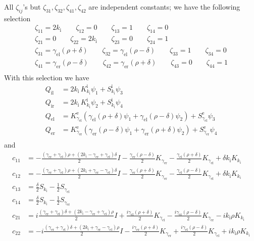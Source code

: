 All $\zeta_{ij}$'s but $\zeta_{31},\zeta_{32},\zeta_{41},\zeta_{42}$ are independent constants; we have the following selection 
\begin{gather*}
  \zeta_{11} = 2 k_\text{i} \qquad \zeta_{12} =0 \qquad \zeta_{13} = 1 \qquad \zeta_{14} = 0\\
  \zeta_{21} = 0 \qquad \zeta_{22} = 2 k_\text{i} \qquad \zeta_{23} = 0 \qquad
\zeta_{24} = 1\\
  \zeta_{31} = \gamma_\text{el}(\rho + \delta) \qquad \zeta_{32} = \gamma_\text{el}(\rho - \delta) \qquad \zeta_{33} = 1 \qquad \zeta_{34} = 0\\
  \zeta_{41} = \gamma_\text{er}(\rho - \delta) \qquad \zeta_{42} = \gamma_\text{er}(\rho + \delta) \qquad \zeta_{43} = 0 \qquad \zeta_{44} = 1\\
\end{gather*}
With this selection we have
\begin{align*}
  Q_\text{il} &= 2 k_\text{i}\,K^\text{i}_{k_\text{i}}\psi_1 + S^\text{i}_{k_\text{i}}\psi_3 \\
  Q_\text{ir} &= 2 k_\text{i}\,K^\text{i}_{k_\text{i}}\psi_2 + S^\text{i}_{k_\text{i}}\psi_4 \\
  Q_\text{el} &= K^{\text{e}}_{\gamma_\text{el}} (\gamma_\text{el} (\rho+\delta)\psi_1 +\gamma_\text{el} (\rho-\delta)\psi_2) + S^{\text{e}}_{\gamma_\text{el}}\psi_3 
 \\
  Q_\text{er} &= K^{\text{e}}_{\gamma_\text{er}} (\gamma_\text{er}(\rho-\delta)\psi_1 + \gamma_\text{er}(\rho+\delta)\psi_2) + S^{\text{e}}_{\gamma_\text{er}}\psi_4 \\
\end{align*}
and
\begin{align*}
  c_{11} &= -\frac{(\gamma_\text{er}+\gamma_\text{el}) \rho+ (2k_\text{i}-\gamma_\text{er}+\gamma_\text{el})\delta}{2} I-\frac{\gamma_\text{er}(\rho-\delta)}{2}K_{\gamma_\text{er}} - \frac{\gamma_\text{el}(\rho+\delta)}{2} K_{\gamma_\text{el}} + \delta k_\text{i} K_{k_\text{i}} \\
  c_{12} &= -\frac{(\gamma_\text{er}+\gamma_\text{el}) \rho+ (2k_\text{i}+\gamma_\text{er}-\gamma_\text{el})\delta}{2}I - \frac{\gamma_\text{er}(\rho+\delta)}{2}K_{\gamma_\text{er}} - \frac{\gamma_\text{el}(\rho-\delta)}{2} K_{\gamma_\text{el}} +\delta k_\text{i} K_{k_\text{i}} \\
  c_{13} &= \frac{\delta}{2}S_{k_\text{i}}-\frac{1}{2} S_{\gamma_\text{el}} \\
  c_{14} &= \frac{\delta}{2}S_{k_\text{i}}-\frac{1}{2} S_{\gamma_\text{er}} \\
  c_{21} &= i\frac{(\gamma_\text{er}+\gamma_\text{el})\delta + (2k_\text{i}-\gamma_\text{er}+\gamma_\text{el})\rho}{2} I + \frac{i \gamma_\text{el}(\rho+\delta)}{2} K_{\gamma_\text{el}} - \frac{i \gamma_\text{er}(\rho-\delta)}{2} K_{\gamma_\text{er}} - i k_\text{i}\rho K_{k_\text{i}} \\
  c_{22} &= -i\frac{(\gamma_\text{er}+\gamma_\text{el})\delta + (2 k_\text{i} + \gamma_\text{er} -\gamma_\text{el})\rho}{2} I -\frac{i \gamma_\text{er}(\rho+\delta)}{2} K_{\gamma_\text{er}} + \frac{i \gamma_\text{el}(\rho-\delta)}{2} K_{\gamma_\text{el}} +i k_\text{i}\rho K_{k_\text{i}} \\
\end{align*}
